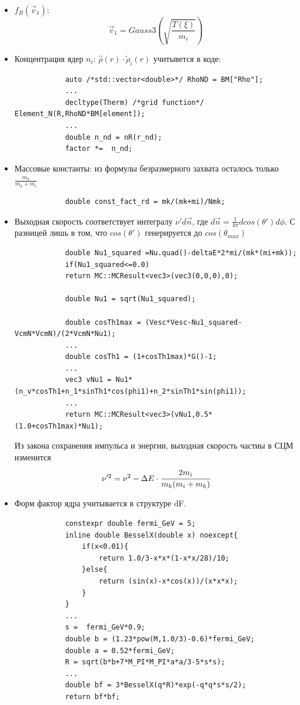 \begin{itemize}
		\item $f_{B}\left( {\vec{v}}_{1} \right)$:
		\begin{equation*}
			\vec{v}_{1} = Gauss3\left(\sqrt{\frac{T(\xi)}{m_i}}\right)
		\end{equation*}
	
		\item Концентрация ядер $n_i$: $\widehat{\rho}(r) \cdot \widetilde{\rho}_i(r)$ учитывется в коде:
		
		\begin{lstlisting}
			auto /*std::vector<double>*/ RhoND = BM["Rho"];
			...
			decltype(Therm) /*grid function*/ Element_N(R,RhoND*BM[element]);
			...
			double n_nd = nR(r_nd);
			factor *=  n_nd;
		\end{lstlisting}
		\item Массовые константы: из формулы безразмерного захвата осталось только $\frac{m_k}{m_k+m_i}$
		\begin{lstlisting}
			double const_fact_rd = mk/(mk+mi)/Nmk;
		\end{lstlisting}
		
		\item Выходная скорость соответствует интегралу $\nu' d\vec{n}$, где 
		$d\vec{n} = \frac{1}{4\pi} dcos(\theta')d\phi$. С разницей лишь в том, что $cos(\theta')$ генерируется до $cos(\theta_{max})$
		\begin{lstlisting}
			double Nu1_squared =Nu.quad()-deltaE*2*mi/(mk*(mi+mk));
			if(Nu1_squared<=0.0)
			return MC::MCResult<vec3>(vec3(0,0,0),0);
			
			double Nu1 = sqrt(Nu1_squared);
			
			double cosTh1max = (Vesc*Vesc-Nu1_squared-VcmN*VcmN)/(2*VcmN*Nu1);
			...
			double cosTh1 = (1+cosTh1max)*G()-1;
			...
			vec3 vNu1 = Nu1*(n_v*cosTh1+n_1*sinTh1*cos(phi1)+n_2*sinTh1*sin(phi1));
			...
			return MC::MCResult<vec3>(vNu1,0.5*(1.0+cosTh1max)*Nu1);
		\end{lstlisting}
		Из закона сохранения импульса и энергии, выходная скорость частиы в СЦМ изменится
		\begin{equation*}
			\nu'^2 = \nu^2 - \Delta E \cdot \cfrac{2m_i}{m_k(m_i+m_k)}
		\end{equation*}
		
		\item Форм фактор ядра учитывается в структуре dF.
		\begin{lstlisting}
			constexpr double fermi_GeV = 5;
			inline double BesselX(double x) noexcept{
				if(x<0.01){
					return 1.0/3-x*x*(1-x*x/28)/10;
				}else{
					return (sin(x)-x*cos(x))/(x*x*x);
				}
			}
			...
			s =  fermi_GeV*0.9;
			double b = (1.23*pow(M,1.0/3)-0.6)*fermi_GeV;
			double a = 0.52*fermi_GeV;
			R = sqrt(b*b+7*M_PI*M_PI*a*a/3-5*s*s);
			...
			double bf = 3*BesselX(q*R)*exp(-q*q*s*s/2);
			return bf*bf;
		\end{lstlisting}
		
	
	\end{itemize}
